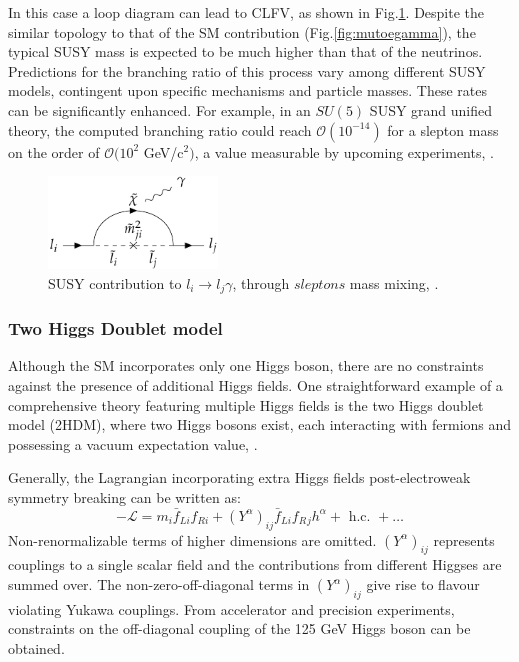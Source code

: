 In this case a loop diagram can lead to CLFV, as shown in Fig.\ref{fig:susy}. 
Despite the similar topology to that of the SM contribution (Fig.\ref{fig:mutoegamma}), 
the typical SUSY mass is expected to be much higher than that of the neutrinos. 
Predictions for the branching ratio of this process vary among different SUSY models, 
contingent upon specific mechanisms and particle masses. These rates can be significantly enhanced.
For example, in an $SU(5)$ SUSY grand unified theory, the 
computed branching ratio could reach $\mathcal{O}(10^{-14})$ for a 
slepton mass on the order of $\mathcal{O}(10^{2}$ GeV/c$^2)$, 
a value measurable by upcoming experiments, \cite{clfv_signorelli}.

\begin{figure}[!h]
\centering
\includegraphics[width =0.4\textwidth]{figures/png/Screenshot_20240218_105920.png}
\caption[SUSY contribution to $l_i \rightarrow l_j\gamma$.]{SUSY contribution to $l_i \rightarrow l_j\gamma$, through $sleptons$ mass mixing, \cite{universe8060299}.}
\label{fig:susy}
\end{figure}


\subsubsection{Two Higgs Doublet model}\label{2higgs}
Although the SM incorporates only one Higgs boson, there are 
no constraints against the presence of additional Higgs fields. 
One straightforward example of a comprehensive theory featuring 
multiple Higgs fields is the two Higgs doublet model 
(2HDM), where two Higgs bosons exist, each interacting with 
fermions and possessing a vacuum expectation value, \cite{Harnik_2013}.

Generally, the Lagrangian incorporating extra Higgs fields post-electroweak symmetry breaking can be written as:
\begin{equation}
-\mathscr{L}=m_i \bar{f}_{L i} f_{R i}+\left(Y^\alpha\right)_{i j} \bar{f}_{L i} f_R{ }_j h^\alpha+\text { h.c. }+\ldots
\end{equation}
Non-renormalizable terms of higher dimensions are omitted. $(Y^\alpha)_{i j}$ represents couplings to a single scalar field and the contributions from different Higgses are summed over. The non-zero-off-diagonal terms in $(Y^\alpha)_{i j}$ give rise to flavour violating Yukawa couplings. From accelerator and precision experiments, constraints on the off-diagonal coupling of the 125 GeV Higgs boson can be obtained.
